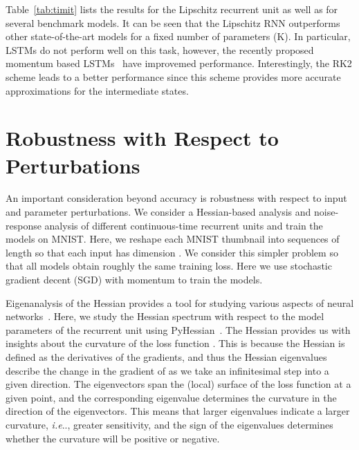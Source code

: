 \documentclass{article} \usepackage{iclr2021_conference,times}
\makeatletter
\DeclareRobustCommand\onedot{\futurelet\@let@token\@onedot}
\def\@onedot{\ifx\@let@token.\else.\null\fi\xspace}
\def\ie{\emph{i.e}\onedot} \def\Ie{\emph{I.e}\onedot}
\makeatother
\begin{document}
Table~\ref{tab:timit} lists the results for the Lipschitz recurrent unit as well as for several benchmark models. It can be seen that the Lipschitz RNN outperforms other state-of-the-art models for a fixed number of parameters (K). In particular, LSTMs do not perform well on this task, however, the recently proposed momentum based LSTMs~\citep{nguyen2020momentumrnn} have improvemed performance.
Interestingly, the RK2 scheme leads to a better performance since this scheme provides more accurate approximations for the intermediate states. 




\section{Robustness with Respect to Perturbations}\label{sec:sensitivity}



An important consideration beyond accuracy is robustness with respect to input and parameter perturbations. We consider a Hessian-based analysis and noise-response analysis of different continuous-time recurrent units and train the models on MNIST. Here, we reshape each MNIST thumbnail into sequences of length  so that each input has dimension .
We consider this simpler problem so that all models obtain roughly the same training loss. Here we use stochastic gradient decent (SGD) with momentum to train the models.

Eigenanalysis of the Hessian provides a tool for studying various aspects of neural networks~\citep{hochreiter1997flat,sagun2017empirical,ghorbani2019investigation}.
Here, we study the Hessian  spectrum with respect to the model parameters of the recurrent unit using PyHessian~\citep{YGKM19_pyhessian_TR}. 
The Hessian provides us with insights about the curvature of the loss function .  
This is because the Hessian is defined as the derivatives of the gradients, and thus the Hessian eigenvalues describe the change in the gradient of  as we take an infinitesimal step into a given direction. 
The eigenvectors span the (local) surface of the loss function at a given point, and the corresponding eigenvalue determines the curvature in the direction of the eigenvectors. 
This means that larger eigenvalues indicate a larger curvature, \ie, greater sensitivity, and the sign of the eigenvalues determines whether the curvature will be positive or negative.
\end{document}
